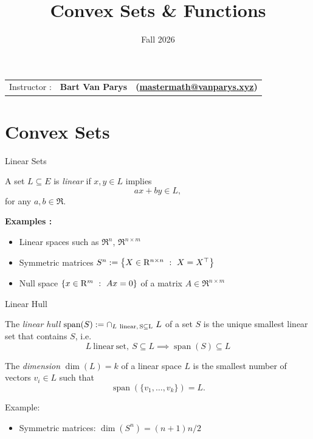 \documentclass[9pt]{beamer}
\title[Continuous Optimization]{Convex Sets \& Functions}
\date[]{Fall 2026}
\begin{document}
\begin{frame}  

  \maketitle

  \vspace{-2em}
  
    \begin{center}
    \begin{tabular}{lll}
      Instructor : & \textbf{Bart Van Parys} & \textbf{(\href{mailto:mastermath@vanparys.xyz}{mastermath@vanparys.xyz})} \\
    \end{tabular}
  \end{center}
  
\end{frame}

\section{Convex Sets}

\begin{frame}{Linear Sets}

  A set $L \subseteq E$ is \emph{linear} if $x, y \in L$ implies
  \[
    a x + b y \in L,
  \]
  for any $a, b \in \Re$.

  \vfill
  \begin{center}
    
  \end{center}
  \vfill

  \textbf{Examples :}
  \begin{itemize}
  \item Linear spaces such as $\Re^n$, $\Re^{n\times m}$
  \item Symmetric matrices $S^n:= \left\{ X\in\mathrm{R}^{n\times n}\ : \ X=X^\top \right\}$
  \item<2-> Null space $\left\{ x\in\mathrm{R}^m\ : \ Ax=0 \right\}$ of a matrix $A\in\Re^{n\times m}$ 
  \end{itemize}
  
\end{frame}

\begin{frame}{Linear Hull}

  The \emph{linear hull} $\operatorname{span} (S) := \cap_{L~\rm{linear},\, S\subseteq L} ~L$ of a set $S$ is the unique smallest linear set that contains $S$, i.e.\
  $$ L~\mathrm{linear~set}, ~S \subseteq L \implies \operatorname{span}(S) \subseteq L$$

  \vfill

  The \emph{dimension} $\dim(L)=k$ of a linear space $L$ is the smallest number of vectors $v_i\in L$ such that $$\operatorname{span}(\{v_1, \dots, v_k\}) = L.$$

  \vfill
  
  Example:
  \begin{itemize}
  \item Symmetric matrices: $\dim(S^n) = (n+1)n/2$
  \end{itemize}
  
\end{frame}
\end{document}
